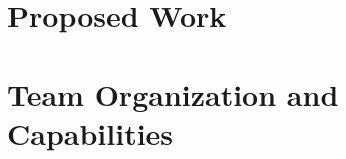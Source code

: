 \documentclass[letterpaper,12pt]{article}
\begin{document}
\section{Proposed Work}



\section{Team Organization and Capabilities}

\nocite{*}
\pagebreak


\end{document}
